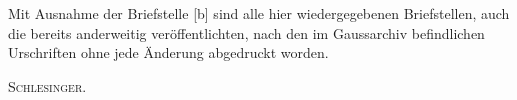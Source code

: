 \par\indent Mit Ausnahme der Briefstelle [b] sind alle hier wiedergegebenen Briefstellen, auch die bereits anderweitig veröffentlichten, nach den im Gaussarchiv befindlichen Urschriften ohne jede Änderung abgedruckt worden.
\par\smallskip\hfill\textsc{Schlesinger.}\par
\ClosingRule
\clearpage
\endgroup
